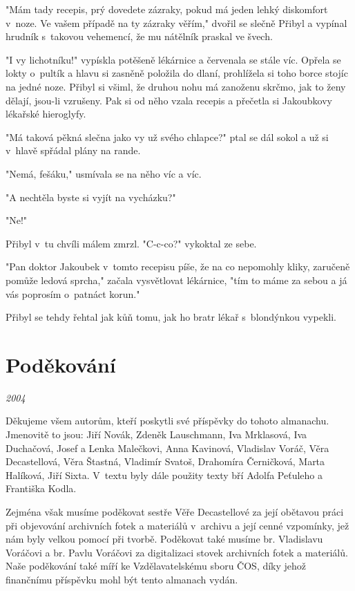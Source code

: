 \documentclass[a5paper, 12pt, twoside]{article}
\begin{document}
"Mám tady recepis, prý dovedete zázraky, pokud má jeden lehký diskomfort
v~noze. Ve vašem případě na ty zázraky věřím," dvořil se slečně Přibyl
a vypínal hrudník s~takovou vehemencí, že mu nátělník praskal ve švech.

"I vy lichotníku!{}" vypískla potěšeně lékárnice a červenala se stále
víc. Opřela se lokty o~pultík a hlavu si zasněně položila do dlaní,
prohlížela si toho borce stojíc na jedné noze. Přibyl si všiml, že
druhou nohu má zanoženu skrčmo, jak to ženy dělají, jsou-li vzrušeny.
Pak si od něho vzala recepis a přečetla si Jakoubkovy lékařské
hieroglyfy.

"Má taková pěkná slečna jako vy už svého chlapce?{}" ptal se dál sokol
a už si v~hlavě spřádal plány na rande.

"Nemá, fešáku," usmívala se na něho víc a víc.

"A nechtěla byste si vyjít na vycházku?{}"

"Ne!{}"

Přibyl v~tu chvíli málem zmrzl. "C-c-co?{}" vykoktal ze sebe.

"Pan doktor Jakoubek v~tomto recepisu píše, že na co nepomohly kliky,
zaručeně pomůže ledová sprcha," začala vysvětlovat lékárnice, "tím to
máme za sebou a já vás poprosím o~patnáct korun."

Přibyl se tehdy řehtal jak kůň tomu, jak ho bratr lékař s~blondýnkou
vypekli.

\section{Poděkování}

\textit{2004}

Děkujeme všem autorům, kteří poskytli své příspěvky do tohoto almanachu.
Jmenovitě to jsou: Jiří Novák, Zdeněk Lauschmann, Iva Mrklasová, Iva
Duchačová, Josef a Lenka Malečkovi, Anna Kavinová, Vladislav Voráč, Věra
Decastellová, Věra Štastná, Vladimír Svatoš, Drahomíra Černičková, Marta
Halíková, Jiří Sixta. V~textu byly dále použity texty bří Adolfa
Peťuleho a Františka Kodla.

Zejména však musíme poděkovat sestře Věře Decastellové za její obětavou
práci při objevování archivních fotek a materiálů v~archivu a její cenné
vzpomínky, jež nám byly velkou pomocí při tvorbě. Poděkovat také musíme
br. Vladislavu Voráčovi a br. Pavlu Voráčovi za digitalizaci stovek
archivních fotek a materiálů. Naše poděkování také míří ke
Vzdělavatelskému sboru ČOS, díky jehož finančnímu příspěvku mohl být
tento almanach vydán.
\end{document}

